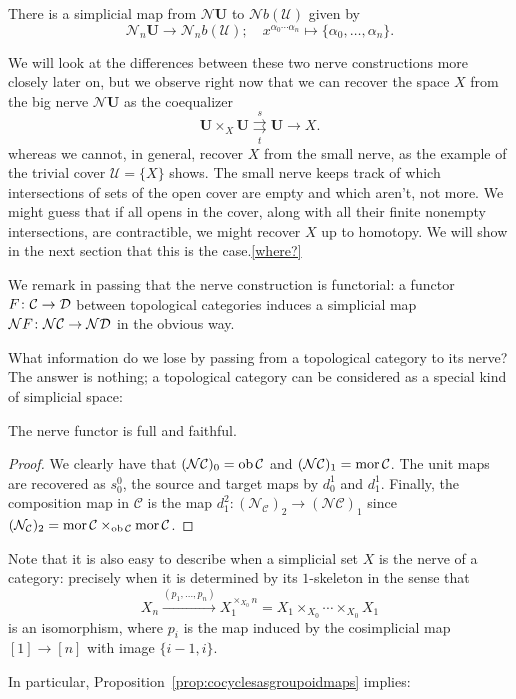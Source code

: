 \documentclass[a4paper,openany]{scrbook}
\renewcommand{\C}{\mathcal C}
\newcommand{\nerve}{\mathcal N}
\begin{document}
There is a simplicial map from $\nerve\mathbf U$ to $\nerve b(\mathcal U)$ given by
\[
\nerve_n\mathbf U \to \nerve_nb(\mathcal U); \quad x^{\alpha_0\cdots\alpha_n} \mapsto \{\alpha_0,\dots,\alpha_n\}.
\]

We will look at the differences between these two nerve constructions more closely later on, but we observe right now that we can recover the space $X$ from the big nerve $\nerve\mathbf U$ as the coequalizer
\[
\mathbf U \times_X \mathbf U \overset{s}{\underset{t}{\rightrightarrows}} \mathbf U \to X.
\]
whereas we cannot, in general, recover $X$ from the small nerve, as the example of the trivial cover $\mathcal U = \{X\}$ shows. The small nerve keeps track of which intersections of sets of the open cover are empty and which aren't, not more. We might guess that if all opens in the cover, along with all their finite nonempty intersections, are contractible, we might recover $X$ up to homotopy. We will show in the next section that this is the case.\ref{where?}

We remark in passing that the nerve construction is functorial: a functor $F\colon \C \to \D$ between topological categories induces a simplicial map $\nerve F\colon \nerve\C \to \nerve\D$ in the obvious way. 

What information do we lose by passing from a topological category to its nerve? The answer is nothing; a topological category can be considered as a special kind of simplicial space:

\begin{prop}\label{prop:nervefullyfaithful}
The nerve functor is full and faithful. 
\end{prop}
\begin{proof}
We clearly have that $(\nerve\C)_0 = \ob\C$ and $(\nerve\C)_1 = \mor\C$. The unit maps are recovered as $s^0_0$, the source and target maps by $d^1_0$ and $d^1_1$. Finally, the composition map in $\C$ is the map $d^2_1\colon (\nerve_\C)_2 \to (\nerve\C)_1$ since $(\nerve_\C)_2 = \mor\C \times_{\ob\C} \mor\C$.
\end{proof}

Note that it is also easy to describe when a simplicial set $X$ is the nerve of a category: precisely when it is determined by its $1$-skeleton in the sense that
\[
X_n \xrightarrow{(p_1,\dots,p_n)} X_1^{\times_{X_0} n} = X_1 \times_{X_0} \cdots \times_{X_0} X_1
\]
is an isomorphism, where $p_i$ is the map induced by the cosimplicial map $[1] \to [n]$ with image $\{i-1,i\}$.

In particular, Proposition~\ref{prop:cocyclesasgroupoidmaps} implies:
\end{document}
